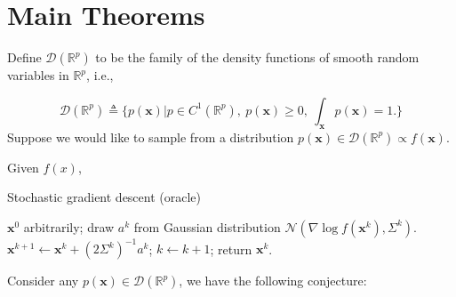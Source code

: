 \documentclass[preprint,12pt,3p]{elsarticle}
\newcommand{\bx}{\mathbf{x}}
\newcommand{\R}{\mathbb{R}}
\newcommand{\D}{\mathscr{D}}
\newcommand{\N}{\mathscr{N}}
\begin{document}
\section{Main Theorems}

Define $\D(\R^p)$ to be the family of the density functions of smooth random variables in $\R^p$, i.e.,

\begin{equation}
\D(\R^p)\triangleq \{p(\bx)\Big| p\in C^1(\R^p),~p(\bx) \geq 0,~ \int_\bx p(\bx) = 1.\}
\end{equation}
Suppose we would like to sample from a distribution $p(\bx)\in \D(\R^p) \propto f(\bx)$.
\begin{algorithm}[H]
{\small
Given $f(x)$,
\begin{algorithmic}\caption{Stochastic gradient descent (oracle)}\label{Alg:SGD}
 $ \bx^0$ arbitrarily;
\STATE draw $a^k$ from Gaussian distribution $\N(\nabla \log f(\bx^k), \Sigma^{k})$.
\STATE
$\bx^{k+1} \gets \bx^k + (2\Sigma^k)^{-1} a^k$;
\STATE $k\gets k+1$;
\ENDWHILE
\STATE return $\bx^k$.
\end{algorithmic}}
\end{algorithm}


Consider any $p(\bx)\in \D(\R^p)$, we have the following conjecture:
\end{document}

